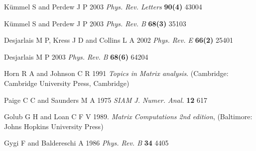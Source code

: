 \documentclass[12pt]{iopart}
\begin{document}
\begin{thebibliography}{14}
K\"{u}mmel S and Perdew J P 2003
{\it Phys. Rev. Letters} {\bf 90(4)} 43004

K\"{u}mmel S and Perdew J P 2003
{\it Phys. Rev. B} {\bf 68(3)} 35103

Desjarlais M P, Kress J D and Collins L A 2002
{\it Phys. Rev. E} {\bf 66(2)} 25401

Desjarlais M P 2003
{\it Phys. Rev. B} {\bf 68(6)} 64204

Horn R A and Johnson C R 1991
{\it Topics in Matrix analysis}.
(Cambridge: Cambridge University Press, Cambridge)

Paige C C and Saunders M A 1975
{\it {SIAM} J. Numer. Anal.} {\bf 12} 617

Golub G H and Loan C F V 1989.
{\it Matrix Computations 2nd edition},
(Baltimore: Johns Hopkins University Press)

Gygi F and Baldereschi A 1986
{\it Phys. Rev. B} {\bf 34} 4405

\end{thebibliography}
\end{document}
